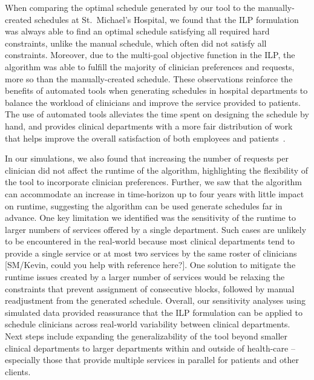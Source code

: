 When comparing the optimal schedule generated by our tool to the
manually-created schedules at St.\ Michael's Hospital, we found that the ILP
formulation was always able to find an optimal schedule satisfying all required
hard constraints, unlike the manual schedule, which often did not satisfy all
constraints. Moreover, due to the multi-goal objective function in
the ILP, the algorithm was able to fulfill the majority of clinician
preferences and requests, more so than the manually-created schedule. These
observations reinforce the benefits of automated tools when generating schedules
in hospital departments to balance the workload of clinicians and improve the
service provided to patients. The use of automated tools alleviates the time
spent on designing the schedule by hand, and provides clinical departments with
a more fair distribution of work that helps improve the overall satisfaction of
both employees and patients~\cite{silvestro_evaluation_2000}.  %

In our simulations, we also found that increasing the number of requests per
clinician did not affect the runtime of the algorithm, highlighting the
flexibility of the tool to incorporate clinician preferences. Further, we saw
that the algorithm can accommodate an increase in time-horizon up to four years
with little impact on runtime, suggesting the algorithm can be used generate
schedules far in advance. One key limitation we identified was the sensitivity
of the runtime to larger numbers of services offered by a single department.
Such cases are unlikely to be encountered in the real-world because most
clinical departments tend to provide a single service or at most two services by
the same roster of clinicians [{\color{red}SM/Kevin, could you help with
	reference here?}]. One solution to mitigate the runtime issues created by a
larger number of services would be relaxing the constraints that prevent
assignment of consecutive blocks, followed by manual readjustment from the
generated schedule. %
Overall, our sensitivity analyses using simulated data provided reassurance that
the ILP formulation can be applied to schedule clinicians across real-world
variability between clinical departments. %
Next steps include expanding the generalizability of the tool beyond smaller
clinical departments to larger departments within and outside of health-care --
especially those that provide multiple services in parallel for patients and
other clients. 
